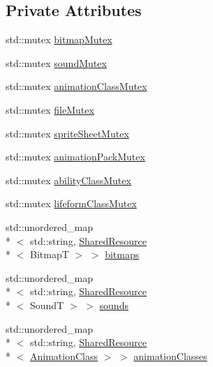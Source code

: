 \subsection*{Private Attributes}
\begin{DoxyCompactItemize}
\item 
std\+::mutex \hyperlink{classZeta_1_1SynchronousResourceContext_ae7d5c99c24762905e6cc314fedb91c0c}{bitmap\+Mutex}
\item 
std\+::mutex \hyperlink{classZeta_1_1SynchronousResourceContext_aa7904efdbca71cf9c2bd5eb173f833c5}{sound\+Mutex}
\item 
std\+::mutex \hyperlink{classZeta_1_1SynchronousResourceContext_a5bf36b85ddebabaac9ea46b7f42ec9a4}{animation\+Class\+Mutex}
\item 
std\+::mutex \hyperlink{classZeta_1_1SynchronousResourceContext_ad83017d7bfd0b5c61ec19a18ef89b288}{file\+Mutex}
\item 
std\+::mutex \hyperlink{classZeta_1_1SynchronousResourceContext_a20f00d1c973bfd31be6d14ccfc1c0138}{sprite\+Sheet\+Mutex}
\item 
std\+::mutex \hyperlink{classZeta_1_1SynchronousResourceContext_a48a55edb975afcd2681c98803620f834}{animation\+Pack\+Mutex}
\item 
std\+::mutex \hyperlink{classZeta_1_1SynchronousResourceContext_a69f971f6543a486673fa6c79cec08e52}{ability\+Class\+Mutex}
\item 
std\+::mutex \hyperlink{classZeta_1_1SynchronousResourceContext_aca2297e03ae27fb38aee8d4a3e5ab2b2}{lifeform\+Class\+Mutex}
\item 
std\+::unordered\+\_\+map\\*
$<$ std\+::string, \hyperlink{classZeta_1_1SharedResource}{Shared\+Resource}\\*
$<$ Bitmap\+T $>$ $>$ \hyperlink{classZeta_1_1SynchronousResourceContext_aae69d1a9031c5ed934cf32ac126e9bc8}{bitmaps}
\item 
std\+::unordered\+\_\+map\\*
$<$ std\+::string, \hyperlink{classZeta_1_1SharedResource}{Shared\+Resource}\\*
$<$ Sound\+T $>$ $>$ \hyperlink{classZeta_1_1SynchronousResourceContext_a22e87474e59bc81d6a2cfa5ee98e277e}{sounds}
\item 
std\+::unordered\+\_\+map\\*
$<$ std\+::string, \hyperlink{classZeta_1_1SharedResource}{Shared\+Resource}\\*
$<$ \hyperlink{classZeta_1_1AnimationClass}{Animation\+Class} $>$ $>$ \hyperlink{classZeta_1_1SynchronousResourceContext_ae7a50d651f47ae84c2b1e700ea690698}{animation\+Classes}

\end{DoxyCompactItemize}
